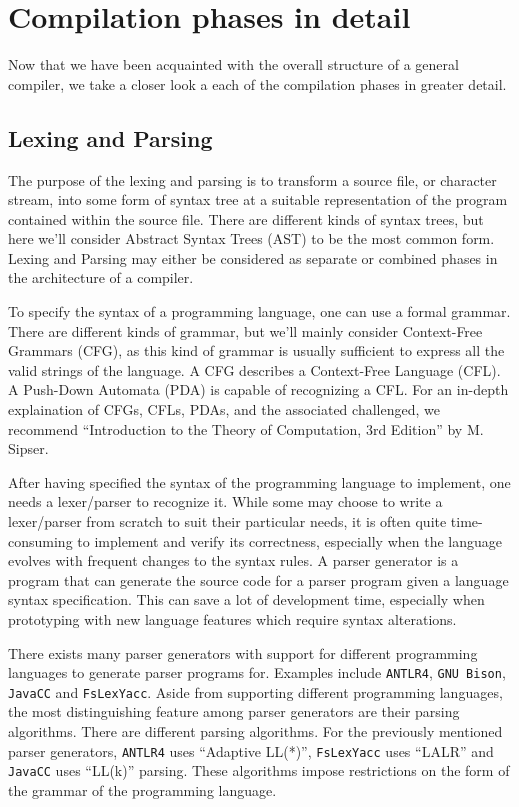 \section{Compilation phases in detail}

Now that we have been acquainted with the overall structure of a general compiler, we take a closer look a each of the compilation phases in greater detail.

\subsection{Lexing and Parsing}

The purpose of the lexing and parsing is to transform a source file, or character stream, into some form of syntax tree at a suitable representation of
the program contained within the source file. There are different kinds of syntax trees, but here we'll consider Abstract Syntax Trees (AST) to be the
most common form. Lexing and Parsing may either be considered as separate or combined phases in the architecture of a compiler.

To specify the syntax of a programming language, one can use a formal grammar. There are different kinds of grammar, but we'll mainly consider Context-Free
Grammars (CFG), as this kind of grammar is usually sufficient to express all the valid strings of the language. A CFG describes a Context-Free Language (CFL).
A Push-Down Automata (PDA) is capable of recognizing a CFL. For an in-depth explaination of CFGs, CFLs, PDAs, and the associated challenged, we
recommend ``Introduction to the Theory of Computation, 3rd Edition'' by M. Sipser.

After having specified the syntax of the programming language to implement, one needs a lexer/parser to recognize it. While some may choose to write a lexer/parser
from scratch to suit their particular needs, it is often quite time-consuming to implement and verify its correctness, especially when the language evolves with
frequent changes to the syntax rules. A parser generator is a program that can generate the source code for a parser program given a language syntax specification.
This can save a lot of development time, especially when prototyping with new language features which require syntax alterations.

There exists many parser generators with support for different programming languages to generate parser programs for. Examples include \texttt{ANTLR4}, \texttt{GNU Bison},
\texttt{JavaCC} and \texttt{FsLexYacc}. Aside from supporting different programming languages, the most distinguishing feature among parser generators are their parsing algorithms.
There are different parsing algorithms. For the previously mentioned parser generators, \texttt{ANTLR4} uses ``Adaptive LL(*)'', \texttt{FsLexYacc} uses ``LALR'' and \texttt{JavaCC}
uses ``LL(k)'' parsing. These algorithms impose restrictions on the form of the grammar of the programming language.

